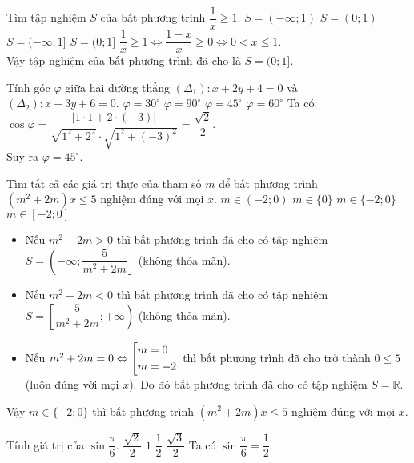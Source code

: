 \begin{ex}%
 Tìm tập nghiệm $S$ của bất phương trình $\dfrac{1}{x} \geq 1$.
 \choice
  {$S = (-\infty;1)$}
  {$S = (0;1)$}
  {$S = (-\infty; 1]$}
  {\True $S = (0;1]$}
 \loigiai
 {
 $\dfrac{1}{x} \geq 1 \Leftrightarrow \dfrac{1 - x}{x} \geq 0 \Leftrightarrow 0 < x \leq 1$.\\
 Vậy tập nghiệm của bất phương trình đã cho là  $S = (0;1]$.
 }
\end{ex}


\begin{ex}%
 Tính góc $\varphi$ giữa hai đường thẳng $(\Delta_1): x+2y+4=0$ và $(\Delta_2): x-3y+6=0$.
 \choice
  {$\varphi = 30^\circ$}
  {$\varphi = 90^\circ$}
  {\True $\varphi = 45^\circ$}
  {$\varphi = 60^\circ$}
 \loigiai
 {
 Ta có: $\cos \varphi = \dfrac{|1 \cdot 1 + 2 \cdot (-3)|}{\sqrt{1^2 + 2^2} \cdot \sqrt{1^2 + (-3)^2}} = \dfrac{\sqrt{2}}{2}$.\\
 Suy ra $\varphi = 45^\circ$.
 }
\end{ex}


\begin{ex}%
 Tìm tất cả các giá trị thực của tham số $m$ để bất phương trình $(m^2+2m)x \leq 5$ nghiệm đúng với mọi $x$.
 \choice
  {$m \in (-2;0)$}
  {$m \in \{0\}$}
  {\True $m \in \{-2;0\}$}
  {$m \in [-2;0]$}
 \loigiai
 {
 \begin{itemize}
  \item Nếu $m^2 + 2m > 0$ thì bất phương trình đã cho có tập nghiệm $S = \left( -\infty; \dfrac{5}{m^2 + 2m} \right]$ (không thỏa mãn).
  \item Nếu $m^2 + 2m < 0$ thì bất phương trình đã cho có tập nghiệm $S = \left[ \dfrac{5}{m^2 + 2m}; +\infty \right)$ (không thỏa mãn).
  \item Nếu $m^2 + 2m = 0 \Leftrightarrow \left[\begin{aligned}& m = 0 \\& m = -2\end{aligned}\right.$ thì bất phương trình đã cho trở thành $0 \leq 5$ (luôn đúng với mọi $x$). Do đó bất phương trình đã cho có tập nghiệm $S = \mathbb{R}$.
 \end{itemize}
Vậy $m \in \{-2;0\}$ thì bất phương trình $(m^2+2m)x \leq 5$ nghiệm đúng với mọi $x$.
 }
\end{ex}


\begin{ex}%
 Tính giá trị của $\sin \dfrac{\pi}{6}$.
 \choice
  {$\dfrac{\sqrt{2}}{2}$}
  {$1$}
  {\True $\dfrac{1}{2}$}
  {$\dfrac{\sqrt{3}}{2}$}
 \loigiai
 {
 Ta có $\sin \dfrac{\pi}{6} = \dfrac{1}{2}$.
 }
\end{ex}


